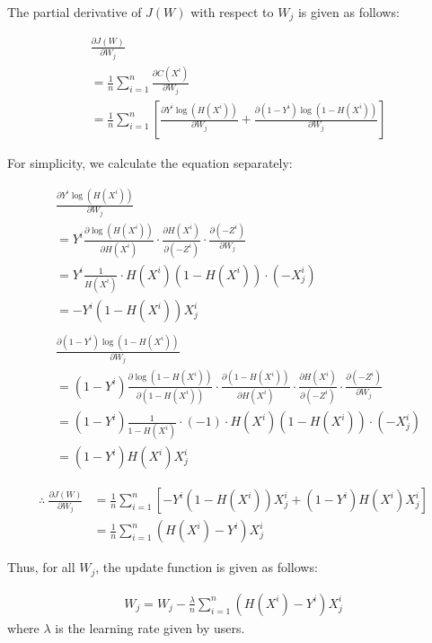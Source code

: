 \documentclass{sig-alternate}
\begin{document}
The partial derivative of $J(W)$ with respect to $W_{j}$ is given as follows:

\begin{align*}
	&\frac{\partial{J(W)}}{\partial{W_{j}}}\\
	&=\frac{1}{n}\sum_{i=1}^{n}\frac{\partial{C(X^{i})}}{\partial{W_{j}}}\\
	&=\frac{1}{n}\sum_{i=1}^{n}[\frac{\partial{Y^{i}\log{(H(X^{i}))}}}{\partial{W_{j}}}+\frac{\partial{(1-Y^{i})\log{(1-H(X^{i}))}}}{\partial{W_{j}}}]
\end{align*}

For simplicity, we calculate the equation separately:

\begin{align*}
	&\frac{\partial{Y^{i}\log{(H(X^{i}))}}}{\partial{W_{j}}}\\
	&=Y^{i}\frac{\partial{\log{(H(X^{i}))}}}{\partial{H(X^{i})}}\cdot \frac{\partial{H(X^{i})}}{\partial{(-Z^{i})}}\cdot \frac{\partial{(-Z^{i})}}{\partial{W_{j}}}\\
	&=Y^{i}\frac{1}{H(X^{i})}\cdot H(X^{i})(1-H(X^{i}))\cdot (-X^{i}_{j})\\
	&=-Y^{i}(1-H(X^{i}))X^{i}_{j}\\
	\\
	&\frac{\partial{(1-Y^{i})\log{(1-H(X^{i}))}}}{\partial{W_{j}}}\\
	&=(1-Y^{i})\frac{\partial{\log{(1-H(X^{i}))}}}{\partial{(1-H(X^{i}))}}\cdot \frac{\partial{(1-H(X^{i}))}}{\partial{H(X^{i})}} \cdot \frac{\partial{H(X^{i})}}{\partial{(-Z^{i})}}\cdot \frac{\partial{(-Z^{i})}}{\partial{W_{j}}}\\
	&=(1-Y^{i})\frac{1}{1-H(X^{i})}\cdot (-1)\cdot H(X^{i})(1-H(X^{i}))\cdot (-X^{i}_{j})\\
	&=(1-Y^{i})H(X^{i})X^{i}_{j}
\end{align*}

\begin{align*}
	\therefore~
	\frac{\partial{J(W)}}{\partial{W_{j}}}
	&=\frac{1}{n}\sum_{i=1}^{n}[-Y^{i}(1-H(X^{i}))X^{i}_{j}+(1-Y^{i})H(X^{i})X^{i}_{j}]\\
	&=\frac{1}{n}\sum_{i=1}^{n}(H(X^{i})-Y^{i})X^{i}_{j}
\end{align*}

Thus, for all $W_{j}$, the update function is given as follows:

\begin{align*}
	W_{j}=W_{j}-\frac{\lambda}{n}\sum_{i=1}^{n}(H(X^{i})-Y^{i})X^{i}_{j}
\end{align*}
where $\lambda$ is the learning rate given by users.
\end{document}
